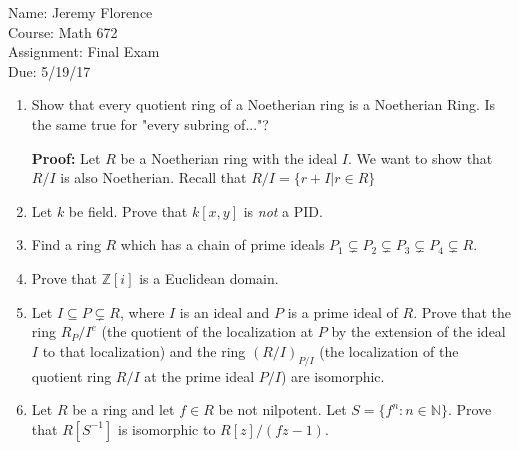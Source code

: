 \documentclass{article}
\newcommand\Proof{%
	\textbf{Proof:} %
}
\begin{document}
Name: Jeremy Florence \\
Course: Math 672 \\
Assignment: Final Exam \\
Due: 5/19/17

\begin{enumerate}
	\item Show that every quotient ring of a Noetherian ring is a Noetherian Ring. Is the same true for "every subring of..."?
	
	\Proof Let $R$ be a Noetherian ring with the ideal $I$. We  want to show that $R/I$ is also Noetherian. Recall that $R/I=\{r+I|r \in R \}$
	
	\item Let $k$ be field. Prove that $k[x,y]$ is \emph{not} a PID.
	
	\item Find a ring $R$ which has a chain of prime ideals $P_1 \subsetneq P_2 \subsetneq P_3 \subsetneq P_4 \subsetneq R$.
	
	\item Prove that $\mathbb{Z}[i]$ is a Euclidean domain.
	
	\item Let $I \subseteq P \subsetneq R$, where $I$ is an ideal and $P$ is a prime ideal of $R$. Prove that the ring $R_P/I^e$ (the quotient of the localization at $P$ by the extension of the ideal $I$ to that localization) and the ring $(R/I)_{P/I}$ (the localization of the quotient ring $R/I$ at the prime ideal $P/I$) are isomorphic.
	
	\item Let $R$ be a ring and let $f \in R$ be not nilpotent. Let $S=\{f^n:n \in \mathbb{N}\}$. Prove that $R[S^{-1}]$ is isomorphic to $R[z]/(fz-1)$. 
\end{enumerate}
\end{document}
